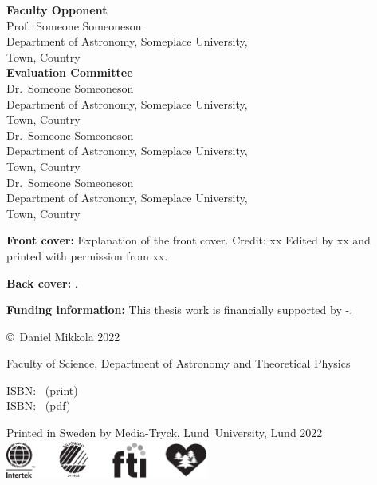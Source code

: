 \documentclass[E5,LUFonts]{lundphdthesis}
\begin{document}
\maketitle


\newpage
\begin{center}
	\textbf{Faculty Opponent} \\
	\vspace{1em}
	Prof.\ Someone Someoneson\\
	Department of Astronomy, Someplace University,\\
	Town, Country\\
	\vspace{1.5em}
	\textbf{Evaluation Committee} \\
	\vspace{1em}
    Dr.\ Someone Someoneson\\
    Department of Astronomy, Someplace University,\\
    Town, Country\\
    \vspace{0.7em}
    Dr.\ Someone Someoneson\\
    Department of Astronomy, Someplace University,\\
    Town, Country\\
	\vspace{0.7em}
    Dr.\ Someone Someoneson\\
    Department of Astronomy, Someplace University,\\
    Town, Country\\
\end{center}
\vfill

{\small\parindent0pt
\textbf{Front cover:} Explanation of the front cover.
Credit: xx Edited by xx and printed with permission from xx.

\textbf{Back cover:} .

\textbf{Funding information:} This thesis work is financially supported by -.

\vspace{1em}
\copyright\, Daniel Mikkola 2022

\vspace{1em}
Faculty of Science, Department of Astronomy and Theoretical Physics

\vspace{1em}
ISBN: ~(print)\\ %
ISBN: ~(pdf) %

\vspace{1em}
Printed in Sweden by Media-Tryck, Lund~University, Lund 2022\\
\includegraphics[width=0.5\textwidth]{logo/miljoeloggor}
}
\end{document}
